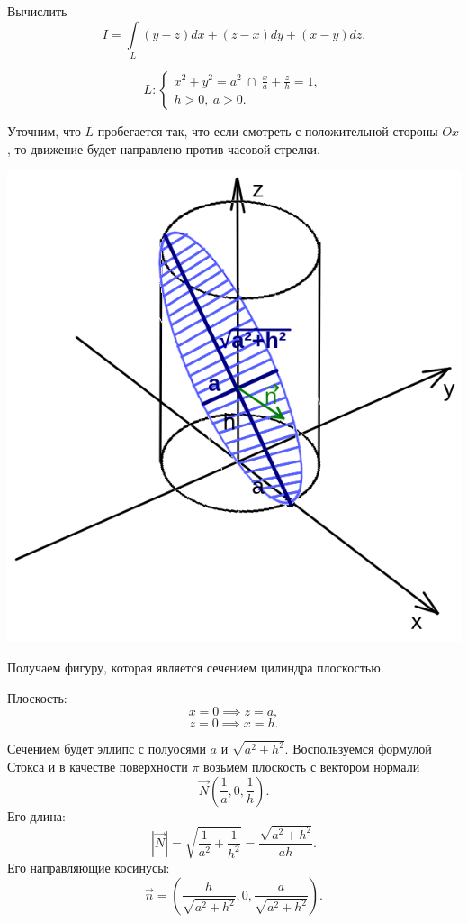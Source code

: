 \documentclass[../../main.tex]{subfiles}
\begin{document}
			
			\begin{example}
				Вычислить
				\[ I = \int \limits_L \left( y-z \right) dx + \left( z-x \right) dy + 
				\left( x-y \right) dz.  \]
				
				\[ L: \begin{cases}
					x^2 + y^2 = a^2\ \cap\ \frac{x}{a} + \frac{z}{h} = 1, \\
					h > 0,\ a > 0.
				   \end{cases}
				 \]
				
			Уточним, что $L$ пробегается так, что если смотреть с положительной стороны 
			$Ox$, то движение будет направлено против часовой стрелки.
			
			\begin{center}
			 \includegraphics[scale=0.75]{lec25-cylinder}
			\end{center}
			
			Получаем фигуру, которая является сечением цилиндра плоскостью.
			
			Плоскость: 
			\[x = 0 \implies z = a,\]
			\[z = 0 \implies x = h.\]
			
			Сечением будет эллипс с полуосями $a$ и $\sqrt{a^2 + h^2}$. Воспользуемся 
			формулой Стокса и в качестве поверхности $\pi$ возьмем плоскость с вектором 
			нормали
			\[ \vec{N}\left( \frac{1}{a}, 0 , \frac{1}{h} \right). \]
			Его длина:
			\[ \left| \vec{N} \right|= \sqrt{\frac{1}{a^2} + \frac{1}{h^2} } = 
			\frac{\sqrt{a^2 + h^2}}{ah}.  \]
			Его направляющие косинусы:
			\[ \vec{n} = \left( \frac{h}{\sqrt{a^2 + h^2}}, 0, \frac{a}{\sqrt{a^2 + 
			h^2}} \right). \]
			

\end{example}
\end{document}
